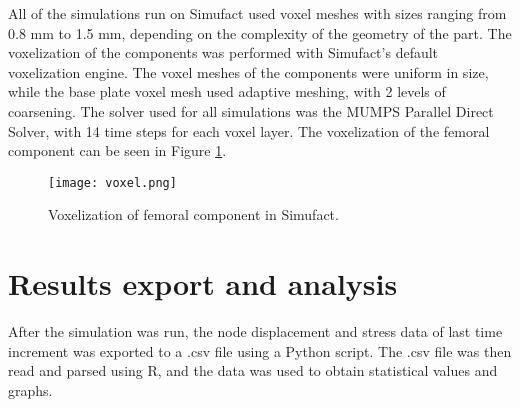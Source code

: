 \documentclass[../main.tex]{subfiles}
\begin{document}
All of the simulations run on Simufact used voxel meshes with sizes ranging from 0.8 mm to 1.5 mm, depending on the complexity of the geometry of the part. The voxelization of the components was performed with Simufact's default voxelization engine. The voxel meshes of the components were uniform in size, while the base plate voxel mesh used adaptive meshing, with 2 levels of coarsening. The solver used for all simulations was the MUMPS Parallel Direct Solver, with 14 time steps for each voxel layer. The voxelization of the femoral component can be seen in Figure \ref{fig:femvox}.

\begin{figure}[h!]
  \centering
  \texttt{[image: voxel.png]}
  \caption{Voxelization of femoral component in Simufact.}
  \label{fig:femvox}
\end{figure}

\section{Results export and analysis}

After the simulation was run, the node displacement and stress data of last time increment was exported to a .csv file using a Python script. The .csv file was then read and parsed using R, and the data was used to obtain statistical values and graphs. 
\end{document}
